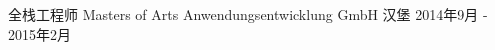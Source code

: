 \cventry
{全栈工程师} %
{Masters of Arts Anwendungsentwicklung GmbH} %
{汉堡} %
{2014年9月 - 2015年2月} %
{ %
}